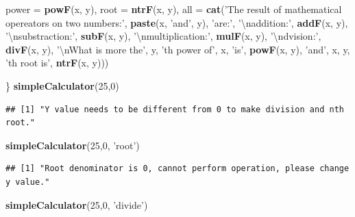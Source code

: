 \documentclass[]{book}
\newenvironment{Shaded}{\begin{snugshade}}{\end{snugshade}}
\newcommand{\KeywordTok}[1]{\textcolor[rgb]{0.12,0.11,0.11}{\textbf{#1}}}
\newcommand{\DataTypeTok}[1]{\textcolor[rgb]{0.00,0.34,0.68}{#1}}
\newcommand{\DecValTok}[1]{\textcolor[rgb]{0.69,0.50,0.00}{#1}}
\newcommand{\CharTok}[1]{\textcolor[rgb]{0.57,0.30,0.62}{#1}}
\newcommand{\StringTok}[1]{\textcolor[rgb]{0.75,0.01,0.01}{#1}}
\newcommand{\NormalTok}[1]{\textcolor[rgb]{0.12,0.11,0.11}{#1}}
\theoremstyle{definition}
\theoremstyle{definition}
\theoremstyle{definition}
\theoremstyle{remark}
\begin{document}
\begin{Shaded}
\begin{Highlighting}[]
         \DataTypeTok{power =} \KeywordTok{powF}\NormalTok{(x, y),}
         \DataTypeTok{root =} \KeywordTok{ntrF}\NormalTok{(x, y),}
         \DataTypeTok{all =} \KeywordTok{cat}\NormalTok{(}\StringTok{'The result of mathematical opereators on two numbers:'}\NormalTok{,}
                      \KeywordTok{paste}\NormalTok{(x, }\StringTok{'and'}\NormalTok{, y), }\StringTok{'are:'}\NormalTok{, }\StringTok{'}\CharTok{\textbackslash{}n}\StringTok{addition:'}\NormalTok{, }\KeywordTok{addF}\NormalTok{(x, y),}
                      \StringTok{'}\CharTok{\textbackslash{}n}\StringTok{substraction:'}\NormalTok{, }\KeywordTok{subF}\NormalTok{(x, y), }\StringTok{'}\CharTok{\textbackslash{}n}\StringTok{multiplication:'}\NormalTok{, }\KeywordTok{mulF}\NormalTok{(x, y),}
                      \StringTok{'}\CharTok{\textbackslash{}n}\StringTok{dvision:'}\NormalTok{, }\KeywordTok{divF}\NormalTok{(x, y), }\StringTok{'}\CharTok{\textbackslash{}n}\StringTok{What is more the'}\NormalTok{, y,}
                      \StringTok{'th power of'}\NormalTok{, x, }\StringTok{'is'}\NormalTok{, }\KeywordTok{powF}\NormalTok{(x, y), }\StringTok{'and'}\NormalTok{, x, y,}
                      \StringTok{'th root is'}\NormalTok{, }\KeywordTok{ntrF}\NormalTok{(x, y)))}

\NormalTok{\}}
\KeywordTok{simpleCalculator}\NormalTok{(}\DecValTok{25}\NormalTok{,}\DecValTok{0}\NormalTok{)}
\end{Highlighting}
\end{Shaded}

\begin{verbatim}
## [1] "Y value needs to be different from 0 to make division and nth root."
\end{verbatim}

\begin{Shaded}
\begin{Highlighting}[]
\KeywordTok{simpleCalculator}\NormalTok{(}\DecValTok{25}\NormalTok{,}\DecValTok{0}\NormalTok{, }\StringTok{'root'}\NormalTok{)}
\end{Highlighting}
\end{Shaded}

\begin{verbatim}
## [1] "Root denominator is 0, cannot perform operation, please change y value."
\end{verbatim}

\begin{Shaded}
\begin{Highlighting}[]
\KeywordTok{simpleCalculator}\NormalTok{(}\DecValTok{25}\NormalTok{,}\DecValTok{0}\NormalTok{, }\StringTok{'divide'}\NormalTok{)}
\end{Highlighting}
\end{Shaded}
\end{document}
